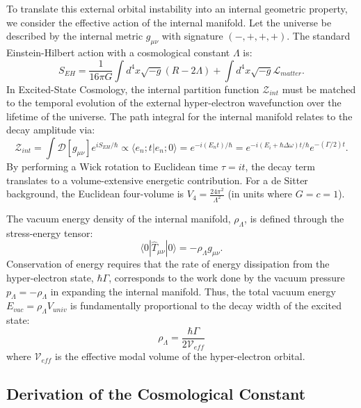 To translate this external orbital instability into an internal geometric property, we consider the effective action of the internal manifold. Let the universe be described by the internal metric $g_{\mu\nu}$ with signature $(-,+,+,+)$. The standard Einstein-Hilbert action with a cosmological constant $\Lambda$ is:
\begin{equation}
    S_{EH} = \frac{1}{16\pi G} \int d^4x \sqrt{-g} (R - 2\Lambda) + \int d^4x \sqrt{-g} \mathcal{L}_{matter}.
\end{equation}
In Excited-State Cosmology, the internal partition function $\mathcal{Z}_{int}$ must be matched to the temporal evolution of the external hyper-electron wavefunction over the lifetime of the universe. The path integral for the internal manifold relates to the decay amplitude via:
\begin{equation}
    \mathcal{Z}_{int} = \int \mathcal{D}[g_{\mu\nu}] e^{i S_{EH}/\hbar} \propto \langle e_n; t | e_n; 0 \rangle = e^{-i (E_n t)/\hbar} = e^{-i(E_i + \hbar \Delta\omega)t/\hbar} e^{-(\Gamma/2) t}.
\end{equation}
By performing a Wick rotation to Euclidean time $\tau = i t$, the decay term translates to a volume-extensive energetic contribution. For a de Sitter background, the Euclidean four-volume is $V_4 = \frac{24\pi^2}{\Lambda^2}$ (in units where $G=c=1$). 

The vacuum energy density of the internal manifold, $\rho_\Lambda$, is defined through the stress-energy tensor:
\begin{equation}
    \langle 0 | \hat{T}_{\mu\nu} | 0 \rangle = - \rho_\Lambda g_{\mu\nu}.
\end{equation}
Conservation of energy requires that the rate of energy dissipation from the hyper-electron state, $\hbar \Gamma$, corresponds to the work done by the vacuum pressure $p_\Lambda = -\rho_\Lambda$ in expanding the internal manifold. Thus, the total vacuum energy $E_{vac} = \rho_\Lambda V_{univ}$ is fundamentally proportional to the decay width of the excited state:
\begin{equation}
    \rho_\Lambda = \frac{\hbar \Gamma}{2 \mathcal{V}_{eff}}
\end{equation}
where $\mathcal{V}_{eff}$ is the effective modal volume of the hyper-electron orbital. 

\subsection{Derivation of the Cosmological Constant}


